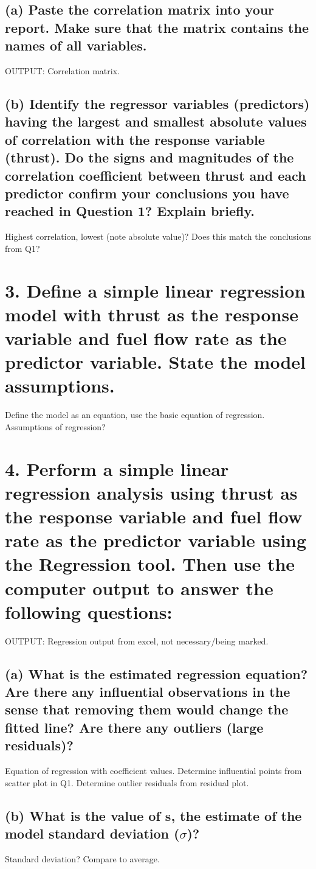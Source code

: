 \documentclass[letterpaper]{article}
\begin{document}
\subsection{(a)	Paste the correlation matrix into your report. Make sure that the matrix contains the names of all variables.}
OUTPUT: Correlation matrix.

\subsection{(b)	Identify the regressor variables (predictors) having the largest and smallest absolute values of correlation with the response variable (thrust). Do the signs and magnitudes of the correlation coefficient between thrust and each predictor confirm your conclusions you have reached in Question 1? Explain briefly.}
Highest correlation, lowest (note absolute value)? Does this
match the conclusions from Q1?

\section{3.	Define a simple linear  regression model with thrust as the response variable and fuel flow rate as the predictor variable.  State the model assumptions.}
Define the model as an equation, use the basic equation of
regression. Assumptions of regression?

\section{4.	Perform a simple linear regression analysis using thrust as the response variable and fuel flow rate as the predictor variable using the Regression tool. Then use the computer output to answer the following questions:}
OUTPUT: Regression output from excel, not necessary/being marked.

\subsection{(a)	What is the estimated regression equation? Are there any influential observations  in the sense that removing them would change the fitted line? Are there any outliers (large residuals)?}
Equation of regression with coefficient values. Determine
influential points from scatter plot in Q1. Determine outlier residuals from residual plot.

\subsection{(b)	What is the value of s, the estimate of the model standard deviation ($\sigma$)?}
Standard deviation? Compare to average.
\end{document}
